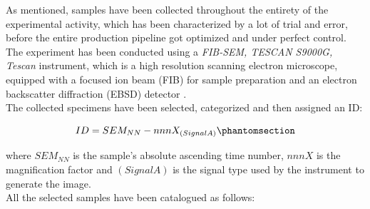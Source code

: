 \documentclass{article}
\begin{document}
            \clearpage

            As mentioned, samples have been collected throughout the entirety of the experimental activity, which has been characterized by a lot of trial and error, 
            before the entire production pipeline got optimized and 
            under perfect control. \\ 

            The experiment has been conducted using a \textit{FIB-SEM, TESCAN S9000G, Tescan} instrument, which is a high resolution 
            scanning electron microscope, equipped with a focused ion beam (FIB) for sample preparation and 
            an electron backscatter diffraction (EBSD) detector \autocites{FIB-SEM_TESCAN_S9000G}. \\

            The collected specimens have been selected, categorized and then assigned an ID:

            \begin{equation}
                ID = SEM_{NN}-nnnX_{(SignalA)}
                \phantomsection
                \label{eq:SEM_ID}
            \end{equation}

            where $SEM_{NN}$ is the sample's absolute ascending time number, $nnnX$ is the magnification factor and $(SignalA)$ is the signal type 
            used by the instrument to generate the image. \\ 



            All the selected samples have been catalogued as follows:
\end{document}
